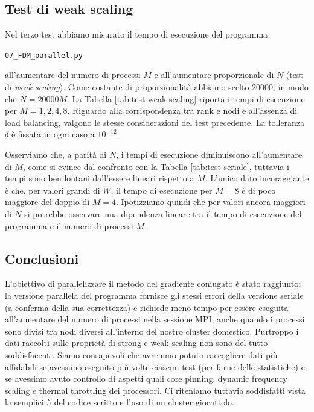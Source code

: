 \documentclass[a4paper,11pt]{article}
\newcommand{\code}[1]{\begin{small}\texttt{#1}\end{small}}
\begin{document}
\subsection{Test di weak scaling}
Nel terzo test abbiamo misurato il tempo di esecuzione
del programma \code{07\_FDM\_parallel.py}
all'aumentare del numero di processi $M$ e all'aumentare
proporzionale di $N$ (test di \emph{weak scaling}).
Come costante di proporzionalità abbiamo scelto 20000,
in modo che $N = 20000 M$.
La Tabella \ref{tab:test-weak-scaling} riporta i tempi
di esecuzione per $M = 1,2,4,8$. Riguardo alla corrispondenza
tra rank e nodi e all'assenza di load balancing, valgono
le stesse considerazioni del test precedente.
La tolleranza $\delta$ è fissata in ogni caso a $10^{-12}$.

Osserviamo che, a parità di $N$, i tempi di esecuzione
diminuiscono all'aumentare di $M$, come si
evince dal confronto con la Tabella \ref{tab:test-seriale},
tuttavia i tempi sono ben lontani dall'essere lineari
rispetto a $M$. L'unico dato incoraggiante è che, per
valori grandi di $W$, il tempo di esecuzione per $M = 8$
è di poco maggiore del doppio di $M = 4$. Ipotizziamo quindi
che per valori ancora maggiori di $N$ si potrebbe osservare
una dipendenza lineare tra il tempo di esecuzione del
programma e il numero di processi $M$.

\subsection{Conclusioni}
L'obiettivo di parallelizzare il metodo del gradiente
coniugato è stato raggiunto: la versione parallela del programma
fornisce gli stessi errori della versione seriale (a conferma della
sua correttezza) e richiede meno tempo per essere eseguita
all'aumentare del numero di processi nella sessione MPI,
anche quando i processi sono divisi tra nodi diversi
all'interno del nostro cluster domestico.
Purtroppo i dati raccolti sulle proprietà di strong e weak
scaling non sono del tutto soddisfacenti.
Siamo consapevoli che avremmo potuto raccogliere
dati più affidabili se avessimo eseguito più volte ciascun test
(per farne delle statistiche) e se avessimo avuto controllo di
aspetti quali core pinning, dynamic frequency scaling
e thermal throttling dei processori. Ci riteniamo
tuttavia soddisfatti vista la semplicità del codice scritto
e l'uso di un cluster giocattolo.
\end{document}
